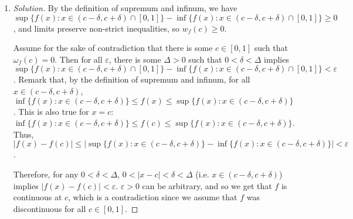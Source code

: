 \documentclass{article}
\newcommand{\ep}{{\varepsilon}}
\begin{document}
\begin{enumerate}
	\item \begin{proof}[Solution]\let\qed\relax
		By the definition of supremum and infinum,
		we have $\sup\{f(x) \colon x \in (c - \delta, c+ \delta) \cap [0,1]\}
		- \inf\{f(x) \colon x \in (c - \delta, c + \delta) \cap [0,1]\} \geq 0$,
		and limits preserve non-strict inequalities, so
		$w_f(c) \geq 0$.

		Assume for the sake of contradiction that there is some $c \in [0,1]$
		such that $\omega_f(c) = 0$.
		Then for all $\ep$,
		there is some $\Delta > 0$ such that
		$0 < \delta < \Delta$ implies
		$\sup\{f(x) \colon x \in (c - \delta, c+ \delta) \cap [0,1]\}
		- \inf\{f(x) \colon x \in (c - \delta, c + \delta) \cap [0,1]\} < \ep$.
		Remark that, by the definition of supremum and infinum,
		for all $x \in (c-\delta, c+ \delta)$,
		$\inf\{f(x) \colon x \in (c - \delta, c + \delta)\} \leq f(x)
		\leq \sup\{f(x) \colon x \in (c - \delta, c + \delta)\}$.
		This is also true for $x = c$:
		$\inf\{f(x) \colon x \in (c - \delta, c + \delta)\} \leq f(c)
		\leq \sup\{f(x) \colon x \in (c - \delta, c + \delta)\}$.
		Thus, $|f(x) - f(c)| \leq
		|\sup\{f(x) \colon x \in (c - \delta, c + \delta)\}
		-\inf\{f(x) \colon x \in (c - \delta, c + \delta)\}| < \ep$.

		Therefore, for any $0 < \delta < \Delta$,
		$0 < |x - c| < \delta < \Delta$ (i.e. $x \in (c-\delta,c+\delta)$)
		implies $|f(x) - f(c)| < \ep$.
		$\ep > 0$ can be arbitrary, and so we get that $f$
		is continuous at $c$, which is a contradiction
		since we assume that $f$ was discontinuous for all $c \in [0,1]$.


\end{proof}
\end{enumerate}
\end{document}

